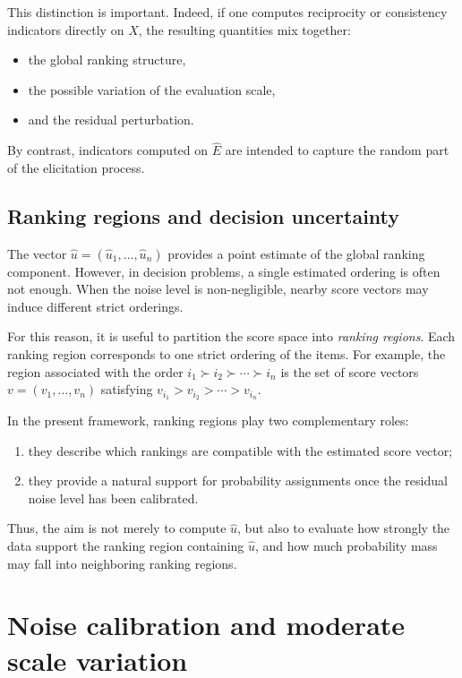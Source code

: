 \documentclass[11pt]{amsart}
\theoremstyle{definition}
\theoremstyle{plain}
\numberwithin{equation}{section}
\begin{document}
This distinction is important. Indeed, if one computes reciprocity or consistency indicators directly on $X$, the resulting quantities mix together:
\begin{itemize}
\item the global ranking structure,
\item the possible variation of the evaluation scale,
\item and the residual perturbation.
\end{itemize}
By contrast, indicators computed on $\widehat E$ are intended to capture the random part of the elicitation process.

\subsection{Ranking regions and decision uncertainty}

The vector $\widehat u=(\widehat u_1,\dots,\widehat u_n)$ provides a point estimate of the global ranking component. However, in decision problems, a single estimated ordering is often not enough. When the noise level is non-negligible, nearby score vectors may induce different strict orderings.

For this reason, it is useful to partition the score space into \emph{ranking regions}. Each ranking region corresponds to one strict ordering of the items. For example, the region associated with the order
\(
i_1 \succ i_2 \succ \cdots \succ i_n
\)
is the set of score vectors $v=(v_1,\dots,v_n)$ satisfying
\(
v_{i_1}>v_{i_2}>\cdots>v_{i_n}.
\)

In the present framework, ranking regions play two complementary roles:
\begin{enumerate}[label=\textup{(\arabic*)}]
\item they describe which rankings are compatible with the estimated score vector;
\item they provide a natural support for probability assignments once the residual noise level has been calibrated.
\end{enumerate}

Thus, the aim is not merely to compute $\widehat u$, but also to evaluate how strongly the data support the ranking region containing $\widehat u$, and how much probability mass may fall into neighboring ranking regions.

\section{Noise calibration and moderate scale variation}
\end{document}
